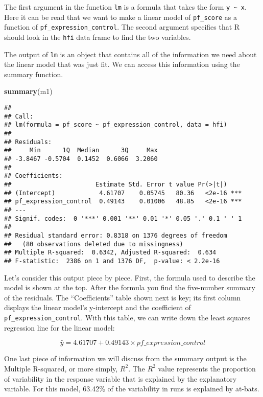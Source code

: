 \documentclass[
]{article}
\newenvironment{Shaded}{\begin{snugshade}}{\end{snugshade}}
\newcommand{\FunctionTok}[1]{\textcolor[rgb]{0.13,0.29,0.53}{\textbf{#1}}}
\newcommand{\NormalTok}[1]{#1}
\begin{document}
The first argument in the function \texttt{lm} is a formula that takes
the form \texttt{y\ \textasciitilde{}\ x}. Here it can be read that we
want to make a linear model of \texttt{pf\_score} as a function of
\texttt{pf\_expression\_control}. The second argument specifies that R
should look in the \texttt{hfi} data frame to find the two variables.

The output of \texttt{lm} is an object that contains all of the
information we need about the linear model that was just fit. We can
access this information using the summary function.

\begin{Shaded}
\begin{Highlighting}[]
\FunctionTok{summary}\NormalTok{(m1)}
\end{Highlighting}
\end{Shaded}

\begin{verbatim}
## 
## Call:
## lm(formula = pf_score ~ pf_expression_control, data = hfi)
## 
## Residuals:
##     Min      1Q  Median      3Q     Max 
## -3.8467 -0.5704  0.1452  0.6066  3.2060 
## 
## Coefficients:
##                       Estimate Std. Error t value Pr(>|t|)    
## (Intercept)            4.61707    0.05745   80.36   <2e-16 ***
## pf_expression_control  0.49143    0.01006   48.85   <2e-16 ***
## ---
## Signif. codes:  0 '***' 0.001 '**' 0.01 '*' 0.05 '.' 0.1 ' ' 1
## 
## Residual standard error: 0.8318 on 1376 degrees of freedom
##   (80 observations deleted due to missingness)
## Multiple R-squared:  0.6342, Adjusted R-squared:  0.634 
## F-statistic:  2386 on 1 and 1376 DF,  p-value: < 2.2e-16
\end{verbatim}

Let's consider this output piece by piece. First, the formula used to
describe the model is shown at the top. After the formula you find the
five-number summary of the residuals. The ``Coefficients'' table shown
next is key; its first column displays the linear model's y-intercept
and the coefficient of \texttt{pf\_expression\_control}. With this
table, we can write down the least squares regression line for the
linear model:

\[ \hat{y} = 4.61707 + 0.49143 \times pf\_expression\_control \]

One last piece of information we will discuss from the summary output is
the Multiple R-squared, or more simply, \(R^2\). The \(R^2\) value
represents the proportion of variability in the response variable that
is explained by the explanatory variable. For this model, 63.42\% of the
variability in runs is explained by at-bats.
\end{document}
